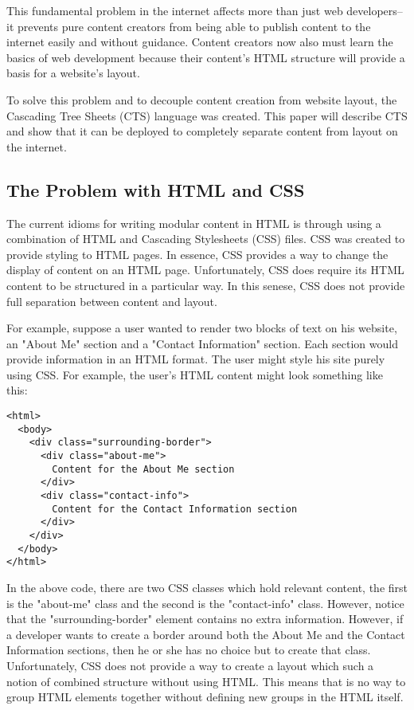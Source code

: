 \documentclass[12pt]{article}
\begin{document}
This fundamental problem in the internet affects more than just web developers--it prevents pure content creators from being able to publish content to the internet easily and without guidance. Content creators now also must learn the basics of web development because their content's HTML structure will provide a basis for a website's layout.

To solve this problem and to decouple content creation from website layout, the Cascading Tree Sheets (CTS) language was created. This paper will describe CTS and show that it can be deployed to completely separate content from layout on the internet.

\subsection{The Problem with HTML and CSS}

The current idioms for writing modular content in HTML is through using a combination of HTML and Cascading Stylesheets (CSS) files. CSS was created to provide styling to HTML pages. In essence, CSS provides a way to change the display of content on an HTML page. Unfortunately, CSS does require its HTML content to be structured in a particular way. In this senese, CSS does not provide full separation between content and layout.

For example, suppose a user wanted to render two blocks of text on his website, an "About Me" section and a "Contact Information" section. Each section would provide information in an HTML format. The user might style his site purely using CSS. For example, the user's HTML content might look something like this:

\begin{lstlisting}
<html>
  <body>
    <div class="surrounding-border">
      <div class="about-me">
        Content for the About Me section
      </div>
      <div class="contact-info">
        Content for the Contact Information section
      </div>
    </div>
  </body>
</html>
\end{lstlisting}

In the above code, there are two CSS classes which hold relevant content, the first is the "about-me" class and the second is the "contact-info" class. However, notice that the "surrounding-border" element contains no extra information. However, if a developer wants to create a border around both the About Me and the Contact Information sections, then he or she has no choice but to create that class. Unfortunately, CSS does not provide a way to create a layout which such a notion of combined structure without using HTML. This means that is no way to group HTML elements together without defining new groups in the HTML itself. 
\end{document}
